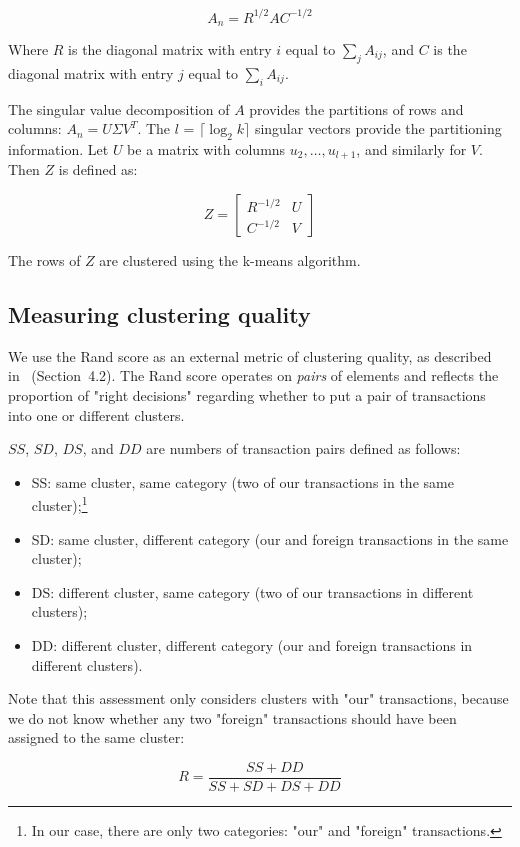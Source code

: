 \[
A_n = R^{1/2}AC^{-1/2}
\]

Where $R$ is the diagonal matrix with entry $i$ equal to $\sum_{j} A_{ij}$, and $C$ is the diagonal matrix with entry $j$ equal to $\sum_{i} A_{ij}$.

The singular value decomposition of $A$ provides the partitions of rows and columns: $A_{n}=U \Sigma V^{T}$.
The $l$ = $\lceil \log_2 k \rceil$ singular vectors provide the partitioning information.
Let $U$ be a matrix with columns $u_2,\dots,u_{l+1}$, and similarly for $V$.
Then $Z$ is defined as:

\[
Z = 
\begin{bmatrix}
R^{-1/2} & U \\
C^{-1/2} & V
\end{bmatrix}
\]

The rows of $Z$ are clustered using the k-means algorithm.


\subsection{Measuring clustering quality}

We use the Rand score as an external metric of clustering quality, as described in~\cite{Amigo2009} (Section~4.2).
The Rand score operates on \textit{pairs} of elements and reflects the proportion of "right decisions" regarding whether to put a pair of transactions into one or different clusters.

$SS$, $SD$, $DS$, and $DD$ are numbers of transaction pairs defined as follows:
\begin{itemize}
	\item SS: same cluster, same category (two of our transactions in the same cluster);\footnote{In our case, there are only two categories: "our" and "foreign" transactions.}
	\item SD: same cluster, different category (our and foreign transactions in the same cluster);
	\item DS: different cluster, same category (two of our transactions in different clusters);
	\item DD: different cluster, different category (our and foreign transactions in different clusters).
\end{itemize}

Note that this assessment only considers clusters with "our" transactions, because we do not know whether any two "foreign" transactions should have been assigned to the same cluster:

\[
R = \frac{SS + DD}{SS + SD + DS + DD}
\]

